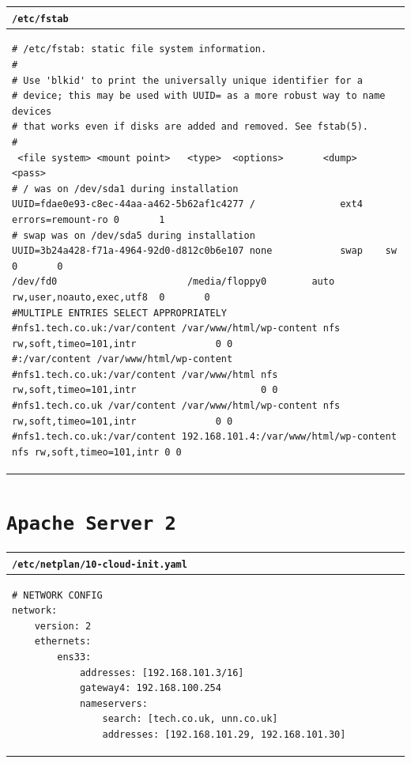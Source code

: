 \documentclass[11pt]{article}
\begin{document}
\begin{table}[ht]
    \begin{tabular}{|p{17.7cm}|} 
        \hline
        \texttt{\textbf{/etc/fstab}}\\ 
        \hline
        \lstset{
                basicstyle=\scriptsize\ttfamily,
              }
              \begin{lstlisting}
# /etc/fstab: static file system information.
#
# Use 'blkid' to print the universally unique identifier for a
# device; this may be used with UUID= as a more robust way to name devices
# that works even if disks are added and removed. See fstab(5).
#
 <file system> <mount point>   <type>  <options>       <dump>  <pass>
# / was on /dev/sda1 during installation
UUID=fdae0e93-c8ec-44aa-a462-5b62af1c4277 /               ext4    errors=remount-ro 0       1
# swap was on /dev/sda5 during installation
UUID=3b24a428-f71a-4964-92d0-d812c0b6e107 none            swap    sw                0       0
/dev/fd0                       /media/floppy0        auto rw,user,noauto,exec,utf8  0       0
#MULTIPLE ENTRIES SELECT APPROPRIATELY
#nfs1.tech.co.uk:/var/content /var/www/html/wp-content nfs  rw,soft,timeo=101,intr              0 0
#:/var/content /var/www/html/wp-content
#nfs1.tech.co.uk:/var/content /var/www/html nfs  rw,soft,timeo=101,intr                      0 0
#nfs1.tech.co.uk /var/content /var/www/html/wp-content nfs  rw,soft,timeo=101,intr              0 0
#nfs1.tech.co.uk:/var/content 192.168.101.4:/var/www/html/wp-content nfs rw,soft,timeo=101,intr 0 0           
        \end{lstlisting}\\
        \hline
    \end{tabular}
\end{table}

\clearpage

\section{\texttt{Apache Server 2}}
\begin{table}[ht]
    \begin{tabular}{|p{17.7cm}|} 
        \hline
        \texttt{\textbf{/etc/netplan/10-cloud-init.yaml}}\\ 
        \hline
        \lstset{
                basicstyle=\scriptsize\ttfamily,
              }
              \begin{lstlisting}
# NETWORK CONFIG
network:
    version: 2
    ethernets:
        ens33:
            addresses: [192.168.101.3/16]
            gateway4: 192.168.100.254
            nameservers:
                search: [tech.co.uk, unn.co.uk]
                addresses: [192.168.101.29, 192.168.101.30]                
        \end{lstlisting}\\
        \hline
    \end{tabular}
\end{table}
\end{document}
